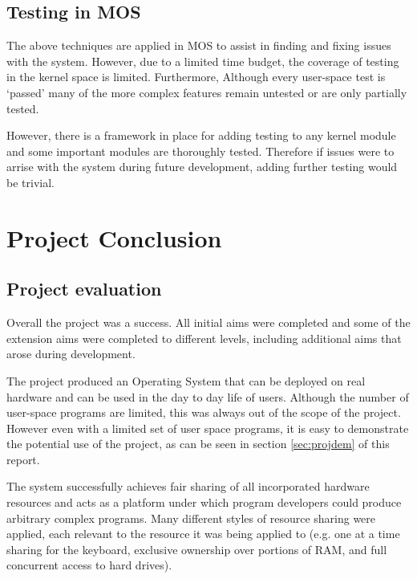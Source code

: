 \documentclass[a4paper]{report}
\begin{document}
\section{Testing in MOS}

The above techniques are applied in MOS to assist in finding and fixing issues with the system. However, due to a limited time budget, the coverage of testing in the kernel space is limited. Furthermore, Although every user-space test is `passed' many of the more complex features remain untested or are only partially tested.

However, there is a framework in place for adding testing to any kernel module and some important modules are thoroughly tested. Therefore if issues were to arrise with the system during future development, adding further testing would be trivial.
























\chapter{Project Conclusion}

\section{Project evaluation}

Overall the project was a success. All initial aims were completed and some of the extension aims were completed to different levels, including additional aims that arose during development.

The project produced an Operating System that can be deployed on real hardware and can be used in the day to day life of users. Although the number of user-space programs are limited, this was always out of the scope of the project. However even with a limited set of user space programs, it is easy to demonstrate the potential use of the project, as can be seen in section \ref{sec:projdem} of this report.

The system successfully achieves fair sharing of all incorporated hardware resources and acts as a platform under which program developers could produce arbitrary complex programs. Many different styles of resource sharing were applied, each relevant to the resource it was being applied to (e.g. one at a time sharing for the keyboard, exclusive ownership over portions of RAM, and full concurrent access to hard drives).
\end{document}
